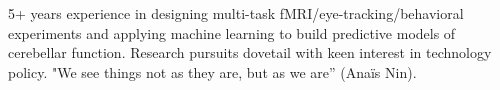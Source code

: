 

\begin{cvparagraph}

5+ years experience in designing multi-task fMRI/eye-tracking/behavioral experiments and applying machine learning to build predictive models of cerebellar function. Research pursuits dovetail with keen interest in technology policy. "We see things not as they are, but as we are” (Anaïs Nin).

\end{cvparagraph}
